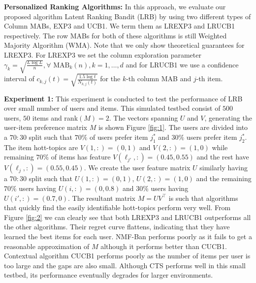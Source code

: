 
\textbf{Personalized Ranking Algorithms:} In this approach, we evaluate our proposed algorithm Latent Ranking Bandit (LRB) by using two different types of Column MABs, EXP3 and UCB1. We term them as LREXP3 and LRUCB1 respectively. The row MABs for both of these algorithms is still Weighted Majority Algorithm (WMA). Note that we only show theoretical guarantees for LREXP3. For LREXP3 we set the column exploration parameter $\gamma_k = \sqrt{\frac{L \log L}{n}}, \forall \text{ MAB}_k(n), k = 1,\dots, d$ and for LRUCB1 we use  a confidence interval of $c_{k, j}(t) = \sqrt{\frac{1.5 \log t}{N_{k,j}(t)}}$ for the $k$-th column MAB and $j$-th item.


\textbf{Experiment 1:} This experiment is conducted to test the performance of LRB over  small number of users and items. This simulated testbed consist of $500$ users, $50$ items and rank$(M) = 2$. The vectors spanning $U$ and $V$, generating the user-item preference matrix $M$ is shown Figure \ref{fig:1}. The users are divided into a $70:30$ split such that $70\%$ of users prefer item $j^*_1$ and $30\%$ users prefer item  $j^*_2$. The item hott-topics are $V(1,:) = (0,1)$ and $V(2,:) = (1, 0)$ while remaining $70\%$ of items has feature $V(\ell_{j'},:) = (0.45, 0.55)$ and the rest have $V(\ell_{j},:) = (0.55, 0.45)$. We create the user feature matrix $U$ similarly having a $70:30$ split such that $U(1,:) = (0,1)$, $U(2,:) = (1,0)$ and the remaining $70\%$ users having $U(i,:) = (0,0.8)$ and $30\%$ users having $U(i',:) = (0.7,0)$. The resultant matrix $M =UV^{\intercal}$ is such that algorithms that quickly find the easily identifiable hott-topics perform very well. From Figure \ref{fig:2} we can clearly see that both LREXP3 and LRUCB1 outperforms all the other algorithms. Their regret curve flattens, indicating that they have learned the best items for each user.  NMF-Ban performs poorly as it fails to get a reasonable approximation of $M$ although it performs better than CUCB1. Contextual algorithm CUCB1 performs poorly as the number of items per user is too large and the gaps are also small. Although CTS performs well in this small testbed, its performance eventually degrades for larger environments. 


